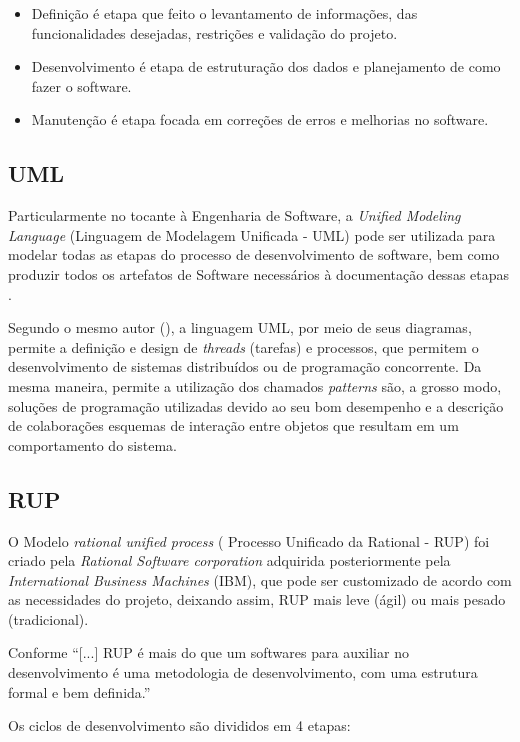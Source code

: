 \begin{itemize}
	\item Definição é etapa que feito o levantamento de informações, das funcionalidades desejadas, restrições e validação do projeto.
	\item Desenvolvimento é etapa de estruturação dos dados e planejamento de como fazer o software.
	\item Manutenção é etapa focada em correções de erros e melhorias no software.
\end{itemize}

\subsection{UML}

Particularmente no tocante à Engenharia de Software, a \textit{Unified Modeling Language} (Linguagem de Modelagem Unificada - UML) pode ser utilizada para modelar todas as etapas do processo de desenvolvimento de software, bem como produzir todos os artefatos de Software necessários à documentação dessas etapas \cite[p. 12]{eng-2015}.

Segundo o mesmo autor (\citeyear{eng-2015}), a linguagem UML, por meio de seus diagramas, permite a definição e design de \textit{threads} (tarefas) e processos, que permitem o desenvolvimento de sistemas distribuídos ou de programação concorrente. Da mesma maneira, permite a utilização dos chamados \textit{patterns} são, a grosso modo, soluções de programação utilizadas devido ao seu bom desempenho e a descrição de colaborações esquemas de interação entre objetos que resultam em um comportamento do sistema.

\subsection{RUP}

O Modelo \textit{rational unified process} ( Processo Unificado da Rational - RUP) foi criado pela \textit{Rational Software corporation} adquirida posteriormente pela \textit{International Business Machines} (IBM), que pode ser customizado de acordo com as necessidades do projeto, deixando assim, RUP mais leve (ágil) ou mais pesado (tradicional).

Conforme  “[...] RUP é mais do que um softwares para auxiliar no desenvolvimento é uma metodologia de desenvolvimento, com uma estrutura formal e bem definida.”

Os ciclos de desenvolvimento são divididos em 4 etapas:


